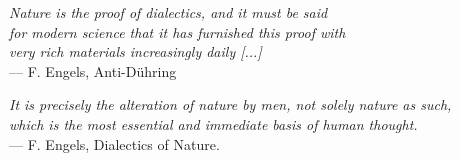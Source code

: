 \thispagestyle{empty}
{}

\vspace*{3cm}

\begin{flushright}{\slshape
	Nature is the proof of dialectics, and it must be said \\
	for modern science that it has furnished this proof with \\
	very rich materials increasingly daily [...]} \\ \medskip
    --- F. Engels, Anti-Dühring
\end{flushright}

\medskip

\begin{flushright}{\slshape
	It is precisely the alteration of nature by men, not solely nature as such, \\
	which is the most essential and immediate basis of human thought.} \\ \medskip
    --- F. Engels, Dialectics of Nature. 
\end{flushright}
